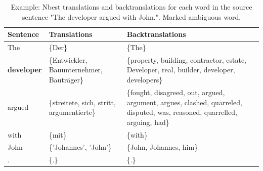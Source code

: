 \begin{table}[!htb]
    \centering
    \begin{tabularx}{\textwidth}{|l|X|X|}
        \hline
        \textbf{Sentence}  & \textbf{Translations} & \textbf{Backtranslations} \\ \hline
        The & \{Der\} & \{The\} \\ 
        \textbf{developer} & \{Entwickler, Bauunternehmer, Bauträger\} & \{property, building, contractor, estate, Developer, real, builder, developer, developers\} \\ 
        argued & \{streitete, sich, stritt, argumentierte\} & \{fought, disagreed, out, argued, argument, argues, clashed, quarreled, disputed, was, reasoned, quarrelled, arguing, had\} \\ 
        with & \{mit\} & \{with\} \\ 
        John & \{'Johannes', 'John'\} & \{John, Johannes, him\} \\ 
        . & \{.\} & \{.\} \\ \hline
    \end{tabularx}
    \caption{Example: Nbest translations and backtranslations for each word in the source sentence "The developer argued with John.". Marked ambiguous word.}
    \label{tab:alignment_example}
\end{table}